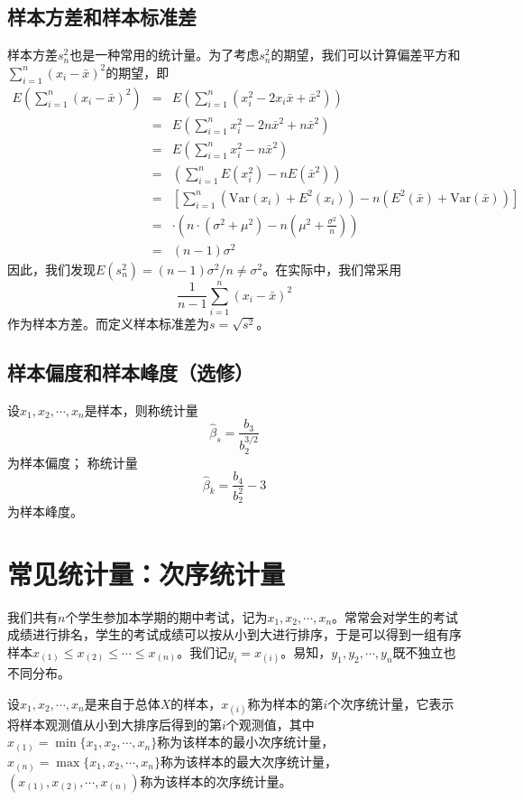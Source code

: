     
\subsection{样本方差和样本标准差}
样本方差$s_{n}^2$也是一种常用的统计量。为了考虑$s_{n}^2$的期望，我们可以计算偏差平方和$\sum_{i=1}^{n}\left(x_{i}-\bar{x}\right)^{2}$的期望，即
\begin{eqnarray*}
E\left( \sum_{i=1}^{n}\left(x_{i}-\bar{x}\right)^{2}\right) 
&=& E\left(\sum_{i=1}^{n}\left(x_{i}^{2}-2 x_{i} \bar{x}+\bar{x}^{2}\right)\right) \\
&=& E\left(\sum_{i=1}^{n} x_{i}^{2}-2 n \bar{x}^{2}+n \bar{x}^{2}\right) \\
&=& E\left(\sum_{i=1}^{n} x_{i}^{2}-n \bar{x}^{2}\right) \\
&=&\left(\sum_{i=1}^{n} E\left(x_{i}^{2}\right)-n E\left(\bar{x}^{2}\right)\right) \\
&=&\left[\sum_{i=1}^{n}\left(\text{Var}\left(x_{i}\right)+E^2\left(x_{i}\right)\right)-n\left(E^{2}(\bar{x})+\text{Var}(\bar{x})\right)\right] \\
&=& \cdot\left(n \cdot\left(\sigma^{2}+\mu^{2}\right)-n\left(\mu^{2}+\frac{\sigma^{2}}{n}\right)\right) \\
&=&(n-1) \sigma^{2}
\end{eqnarray*}
因此，我们发现$E(s_n^2) = (n-1)\sigma^2/n \neq \sigma^2$。在实际中，我们常采用$$
\frac{1}{n-1} \sum_{i=1}^{n}\left(x_{i}-\bar{x}\right)^{2}
$$
作为样本方差。而定义样本标准差为$s = \sqrt{s^2}$。
\subsection{样本偏度和样本峰度（选修）}
\begin{definition}
    设$x_1,x_2,\cdots,x_n$是样本，则称统计量
    $$
    \hat{\beta}_s = \frac{b_3}{b_2^{3/2}}
    $$
    为样本偏度；
    称统计量
    $$
    \hat{\beta}_k = \frac{b_4}{b_2^2} - 3
    $$
    为样本峰度。
\end{definition}
\newpage
\section{常见统计量：次序统计量}
\begin{example}
    我们共有$n$个学生参加本学期的期中考试，记为$x_1,x_2,\cdots,x_{n}$。常常会对学生的考试成绩进行排名，学生的考试成绩可以按从小到大进行排序，于是可以得到一组有序样本$x_{(1)}\leq x_{(2)}\leq \cdots \leq x_{(n)}$。我们记$y_i = x_{(i)}$。易知，$y_1,y_2,\cdots,y_{n}$既不独立也不同分布。
\end{example}
\begin{definition}
    设$x_1,x_2,\cdots,x_n$是来自于总体$X$的样本，$x_{(i)}$称为样本的第$i$个次序统计量，它表示将样本观测值从小到大排序后得到的第$i$个观测值，其中$x_{(1)}=\min\{x_1,x_2,\cdots,x_n\}$称为该样本的最小次序统计量，$x_{(n)}=\max\{x_1,x_2,\cdots,x_n\}$称为该样本的最大次序统计量，$(x_{(1)},x_{(2)},\cdots,x_{(n)})$称为该样本的次序统计量。
\end{definition}

